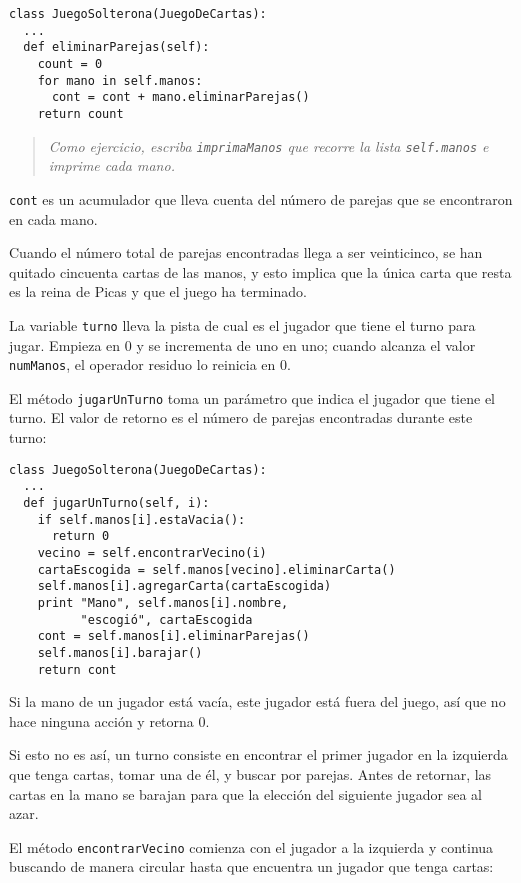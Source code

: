 \beforeverb
\begin{verbatim}
class JuegoSolterona(JuegoDeCartas):
  ...
  def eliminarParejas(self):
    count = 0
    for mano in self.manos:
      cont = cont + mano.eliminarParejas()
    return count
\end{verbatim}
\afterverb
%
\begin{quote}
{\em Como ejercicio, escriba \texttt{imprimaManos} que recorre
la lista \texttt{self.manos} e imprime cada mano.}
\end{quote}

\texttt{cont} es un acumulador que lleva cuenta del número
de parejas que se encontraron en cada mano.


Cuando el número total de parejas encontradas llega a ser 
veinticinco, se han quitado cincuenta cartas de las manos, y esto
implica que la única carta que resta es la reina de Picas
y que el juego ha terminado.

La variable \texttt{turno} lleva la pista de cual es el jugador
que tiene el turno para jugar. Empieza en 0 y se incrementa
de uno en uno; cuando alcanza el valor \texttt{numManos}, el 
operador residuo lo reinicia en 0.

El método  \texttt{jugarUnTurno} toma un parámetro que indica 
el jugador que tiene el turno. El valor de retorno es el 
número de parejas encontradas durante este turno:


\beforeverb
\begin{verbatim}
class JuegoSolterona(JuegoDeCartas):
  ...
  def jugarUnTurno(self, i):
    if self.manos[i].estaVacia():
      return 0
    vecino = self.encontrarVecino(i)
    cartaEscogida = self.manos[vecino].eliminarCarta()
    self.manos[i].agregarCarta(cartaEscogida)
    print "Mano", self.manos[i].nombre, 
          "escogió", cartaEscogida
    cont = self.manos[i].eliminarParejas()
    self.manos[i].barajar()
    return cont
\end{verbatim}
\afterverb
%
Si la mano de un jugador está vacía, este jugador está fuera del juego, 
así que no hace ninguna acción y retorna 0.

Si esto no es así, un turno consiste en encontrar el primer jugador
en la izquierda que tenga cartas, tomar una de él, y buscar por
parejas. Antes de retornar, las cartas en la mano se barajan para que
la elección del siguiente jugador sea al azar.

El método  \texttt{encontrarVecino} comienza con el jugador a la izquierda
y continua buscando de manera circular hasta que encuentra un jugador
que tenga cartas:

